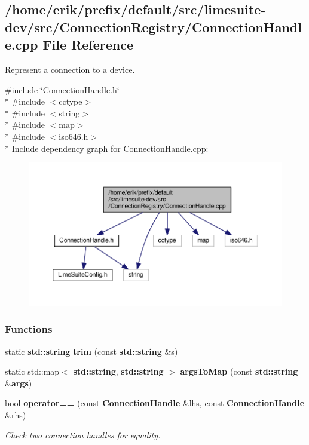 \subsection{/home/erik/prefix/default/src/limesuite-\/dev/src/\+Connection\+Registry/\+Connection\+Handle.cpp File Reference}
\label{ConnectionHandle_8cpp}


Represent a connection to a device.  


{\ttfamily \#include \char`\"{}Connection\+Handle.\+h\char`\"{}}\\*
{\ttfamily \#include $<$cctype$>$}\\*
{\ttfamily \#include $<$string$>$}\\*
{\ttfamily \#include $<$map$>$}\\*
{\ttfamily \#include $<$iso646.\+h$>$}\\*
Include dependency graph for Connection\+Handle.\+cpp\+:
\nopagebreak
\begin{figure}[H]
\begin{center}
\leavevmode
\includegraphics[width=350pt]{d6/de9/ConnectionHandle_8cpp__incl}
\end{center}
\end{figure}
\subsubsection*{Functions}
\begin{DoxyCompactItemize}
\item 
static {\bf std\+::string} {\bf trim} (const {\bf std\+::string} \&s)
\item 
static std\+::map$<$ {\bf std\+::string}, {\bf std\+::string} $>$ {\bf args\+To\+Map} (const {\bf std\+::string} \&{\bf args})
\item 
bool {\bf operator==} (const {\bf Connection\+Handle} \&lhs, const {\bf Connection\+Handle} \&rhs)
\begin{DoxyCompactList}\small\item\em Check two connection handles for equality. \end{DoxyCompactList}\end{DoxyCompactItemize}


